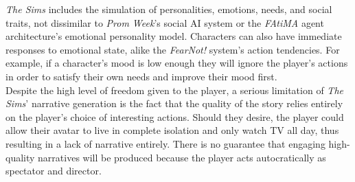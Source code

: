 \documentclass{sig-alternate-05-2015}
\begin{document}
\textit{The Sims} includes the simulation of personalities, emotions, needs, and social traits, not dissimilar to \textit{Prom Week}'s social AI system or the \textit{FAtiMA} agent architecture's emotional personality model. Characters can also have immediate responses to emotional state, alike the \textit{FearNot!} system's action tendencies. For example, if a character's mood is low enough they will ignore the player's actions in order to satisfy their own needs and improve their mood first.\\

Despite the high level of freedom given to the player, a serious limitation of \textit{The Sims}' narrative generation is the fact that the quality of the story relies entirely on the player's choice of interesting actions. Should they desire, the player could allow their avatar to live in complete isolation and only watch TV all day, thus resulting in a lack of narrative entirely. There is no guarantee that engaging high-quality narratives will be produced because the player acts autocratically as spectator and director.
\end{document}
